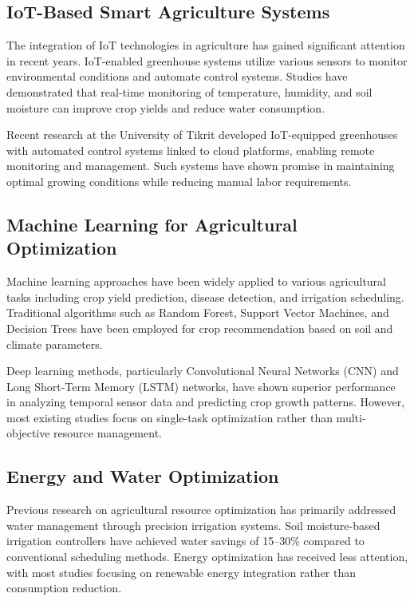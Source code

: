 \documentclass[conference]{IEEEtran}
\begin{document}
\subsection{IoT-Based Smart Agriculture Systems}

The integration of IoT technologies in agriculture has gained significant attention in recent years. IoT-enabled greenhouse systems utilize various sensors to monitor environmental conditions and automate control systems. Studies have demonstrated that real-time monitoring of temperature, humidity, and soil moisture can improve crop yields and reduce water consumption.

Recent research at the University of Tikrit developed IoT-equipped greenhouses with automated control systems linked to cloud platforms, enabling remote monitoring and management. Such systems have shown promise in maintaining optimal growing conditions while reducing manual labor requirements.

\subsection{Machine Learning for Agricultural Optimization}

Machine learning approaches have been widely applied to various agricultural tasks including crop yield prediction, disease detection, and irrigation scheduling. Traditional algorithms such as Random Forest, Support Vector Machines, and Decision Trees have been employed for crop recommendation based on soil and climate parameters.

Deep learning methods, particularly Convolutional Neural Networks (CNN) and Long Short-Term Memory (LSTM) networks, have shown superior performance in analyzing temporal sensor data and predicting crop growth patterns. However, most existing studies focus on single-task optimization rather than multi-objective resource management.

\subsection{Energy and Water Optimization}

Previous research on agricultural resource optimization has primarily addressed water management through precision irrigation systems. Soil moisture-based irrigation controllers have achieved water savings of 15--30\% compared to conventional scheduling methods. Energy optimization has received less attention, with most studies focusing on renewable energy integration rather than consumption reduction.
\end{document}
